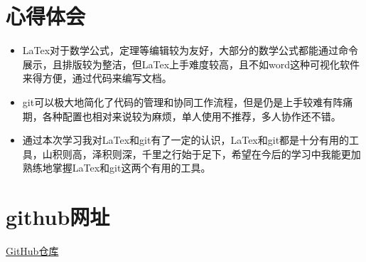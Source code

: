 \documentclass[UTF8]{ctexart}
\begin{document}
  \section{心得体会}
\begin{itemize}
  \item LaTex对于数学公式，定理等编辑较为友好，大部分的数学公式都能通过命令展示，且排版较为整洁，但LaTex上手难度较高，且不如word这种可视化软件来得方便，通过代码来编写文档。\\
  \item git可以极大地简化了代码的管理和协同工作流程，但是仍是上手较难有阵痛期，各种配置也相对来说较为麻烦，单人使用不推荐，多人协作还不错。\\
  \item 通过本次学习我对LaTex和git有了一定的认识，LaTex和git都是十分有用的工具，山积则高，泽积则深，千里之行始于足下，希望在今后的学习中我能更加熟练地掌握LaTex和git这两个有用的工具。
\end{itemize}

  

  \section{github网址}
\href{https://github.com/KeepingMoving/work1.git}{GitHub仓库}
 
\end{document}
